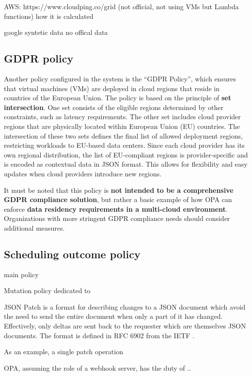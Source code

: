AWS:
https://www.cloudping.co/grid (not official, not using VMs but Lambda functions)
how it is calculated

google
syntetic data
no offical data



\subsection{GDPR policy}

Another policy configured in the system is the ``GDPR Policy'', which ensures that virtual machines (VMs) are deployed in cloud regions that reside in countries of the European Union. 
The policy is based on the principle of \textbf{set intersection}. One set consists of the eligible regions determined by other constraints, such as latency requirements. The other set includes cloud provider regions that are physically located within European Union (EU) countries.
The intersection of these two sets defines the final list of allowed deployment regions, restricting workloads to EU-based data centers.
Since each cloud provider has its own regional distribution, the list of EU-compliant regions is provider-specific and is encoded as contextual data in JSON format. This allows for flexibility and easy updates when cloud providers introduce new regions.

It must be noted that this policy is \textbf{not intended to be a comprehensive GDPR compliance solution}, but rather a basic example of how OPA can enforce \textbf{data residency requirements in a multi-cloud environment}. Organizations with more stringent GDPR compliance needs should consider additional measures.

\subsection{Scheduling outcome policy}

main policy

Mutation policy
dedicated to 



JSON Patch is a format for describing changes to a JSON document which avoid the need to send the entire document when only a part of it has changed. Effectively, only deltas are sent back to the requester which are themselves JSON documents.
The format is defined in RFC 6902 from the IETF \cite{json_patch}.

As an example, a single patch operation 


OPA, assuming the role of a webhook server, has the duty of ..





